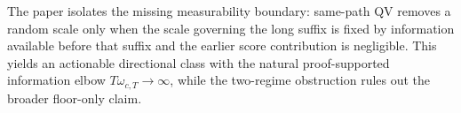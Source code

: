 The paper isolates the missing measurability boundary: same-path QV removes a random scale only when the scale governing the long suffix is fixed by information available before that suffix and the earlier score contribution is negligible. This yields an actionable directional class with the natural proof-supported information elbow \(T\omega_{c,T}\to\infty\), while the two-regime obstruction rules out the broader floor-only claim.